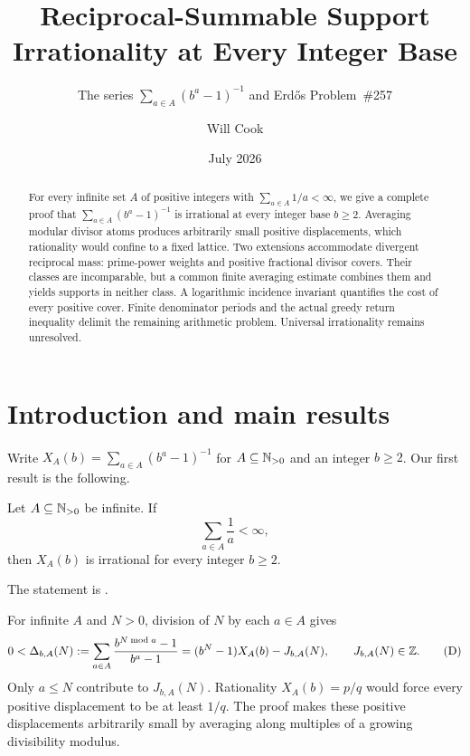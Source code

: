 \documentclass[11pt]{article}
\title{Reciprocal-Summable Support Irrationality at Every Integer Base}
\subtitle{The series $\sum_{a\in A}(b^a-1)^{-1}$ and Erd\H{o}s Problem~\#257}
\author{Will Cook}
\date{July 2026}
\begin{document}
\maketitle
\noteprovenance

\begin{abstract}
For every infinite set $A$ of positive integers with $\sum_{a\in A}1/a<\infty$,
we give a complete proof that $\sum_{a\in A}(b^a-1)^{-1}$ is irrational
at every integer base $b\ge2$.  Averaging modular divisor atoms produces
arbitrarily small positive displacements, which rationality would confine
to a fixed lattice.  Two extensions accommodate divergent reciprocal mass:
prime-power weights and positive fractional divisor covers.  Their classes
are incomparable, but a common finite averaging estimate combines them
and yields supports in neither class.  A logarithmic incidence invariant
quantifies the cost of every positive cover.  Finite denominator periods
and the actual greedy return inequality delimit the remaining arithmetic
problem.  Universal irrationality remains unresolved.
\end{abstract}

\section{Introduction and main results}\label{sec:problem}
Write $X_A(b)=\sum_{a\in A}(b^a-1)^{-1}$ for $A\subseteq\mathbb{N}_{>0}$ and an
integer $b\ge2$.  Our first result is the following.

\begin{theorem}\label{res:reciprocal-support}
Let $A\subseteq\mathbb{N}_{>0}$ be infinite.  If
\[
  \sum_{a\in A}\frac1a<\infty,
\]
then \(X_A(b)\) is irrational for every integer \(b\ge2\).
\end{theorem}

The statement is
\href{https://github.com/wcook04/plectis-erdos/blob/f36a98bf3d3e6f65f1074e3b800e3293d5b8a51a/Erdos249257/AllBaseReciprocalSupportIrrationality.lean#L395}{}.

For infinite $A$ and $N>0$, division of $N$ by each $a\in A$ gives
\[
 0<\Delta_{b,A}(N)
 :=\sum_{a\in A}\frac{b^{N\bmod a}-1}{b^a-1}
 =(b^N-1)X_A(b)-J_{b,A}(N),\qquad J_{b,A}(N)\in\mathbb{Z}.
 \label{eq:intro-displacement}\tag{D}
\]
Only $a\le N$ contribute to $J_{b,A}(N)$.  Rationality $X_A(b)=p/q$
would force every positive displacement to be at least $1/q$.
The proof makes these positive displacements arbitrarily small by
averaging along multiples of a growing divisibility modulus.
\end{document}
